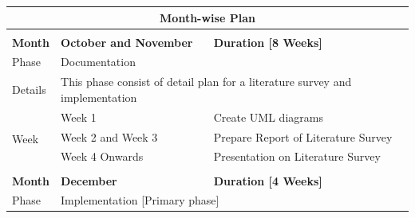 \documentclass[oneside,a4paper,12pt]{report}
\begin{document}
\begin{table}[h!]
\begin{center}
\begin{tabular}{|l|l|l|}
\hline
\multicolumn{3}{|c|}{\textbf{Month-wise Plan}}                                                                                                                                        
\\ \hline
\multicolumn{3}{|l|}{}                                                                                                                                                                \\ \hline
\textbf{Month}        & \textbf{October and November}                  & \textbf{Duration {[}8 Weeks{]}}                                                                                          \\ \hline
Phase                 & \multicolumn{2}{|l|}{Documentation}                                                                                                                           \\ \hline
Details               & \multicolumn{2}{|l|}{This phase consist of detail plan for a literature survey and implementation}                                                            \\ \hline
\multirow{4}{*}{Week} & Week 1                             & Create UML diagrams                                                                                                       \\ \cline{2-3} 
                      & Week 2 and Week 3                  & Prepare Report of Literature Survey                                                                                      \\ \cline{2-3} 
                      & Week 4 Onwards                            & Presentation on Literature Survey                                                                                        \\ \hline
\multicolumn{3}{|l|}{}                                                                                                                                                                \\ \hline
\textbf{Month}        & \textbf{December}                  & \textbf{Duration {[}4 Weeks{]}}                                                                                          \\ \hline
Phase                 & \multicolumn{2}{|l|}{Implementation {[}Primary phase{]}}                                                                                                      \\ \hline

\end{tabular}
\end{center}
\end{table}
\end{document}
